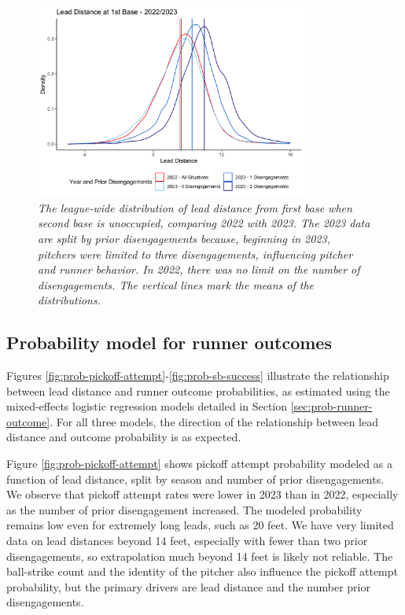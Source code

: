 \documentclass{article}
\begin{document}
      \begin{figure}
        \centering
        \includegraphics[width = 0.8\textwidth]{figures/leads_overall.png}
        \caption{
          \it The league-wide distribution of lead distance from first base when second base is unoccupied, comparing 2022 with 2023. The 2023 data are split by prior disengagements because, beginning in 2023, pitchers were limited to three disengagements, influencing pitcher and runner behavior. In 2022, there was no limit on the number of disengagements. The vertical lines mark the means of the distributions.
        }
        \label{fig:leads-overall}
      \end{figure}
      
    \subsection{Probability model for runner outcomes}

      Figures \ref{fig:prob-pickoff-attempt}-\ref{fig:prob-sb-success} illustrate the relationship between lead distance and runner outcome probabilities, as estimated using the mixed-effects logistic regression models detailed in Section \ref{sec:prob-runner-outcome}. For all three models, the direction of the relationship between lead distance and outcome probability is as expected.

      Figure \ref{fig:prob-pickoff-attempt} shows pickoff attempt probability modeled as a function of lead distance, split by season and number of prior disengagements. We observe that pickoff attempt rates were lower in 2023 than in 2022, especially as the number of prior disengagement increased. The modeled probability remains low even for extremely long leads, such as 20 feet. We have very limited data on lead distances beyond 14 feet, especially with fewer than two prior disengagements, so extrapolation much beyond 14 feet is likely not reliable. The ball-strike count and the identity of the pitcher also influence the pickoff attempt probability, but the primary drivers are lead distance and the number prior disengagements.
      
\end{document}
